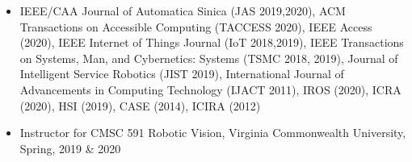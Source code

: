
\begin{justify}
	\begin{itemize}[before=\fontsize{9pt}{1em}\bodyfontlight\upshape\color{text},leftmargin=3ex, nosep, noitemsep]
		\setlength{\parskip}{0pt}
		\renewcommand{\labelitemi}{\bullet}
		\item[] {IEEE/CAA Journal of Automatica Sinica (JAS 2019,2020), ACM Transactions on Accessible Computing (TACCESS 2020), IEEE Access (2020), IEEE Internet of Things Journal (IoT 2018,2019), IEEE Transactions on Systems, Man, and Cybernetics: Systems (TSMC 2018, 2019), Journal of Intelligent Service Robotics (JIST 2019), International Journal of Advancements in Computing Technology (IJACT 2011), IROS (2020), ICRA (2020), HSI (2019), CASE (2014), ICIRA (2012)}
	\end{itemize}
\end{justify}



\begin{justify}
	\begin{itemize}[before=\fontsize{9pt}{1em}\bodyfontlight\upshape\color{text},leftmargin=3ex, nosep, noitemsep]
		\setlength{\parskip}{0pt}
		\renewcommand{\labelitemi}{\bullet}
		\item[] {Instructor for CMSC 591 Robotic Vision, Virginia Commonwealth University, Spring, 2019 \& 2020 }
	\end{itemize}
\end{justify}




